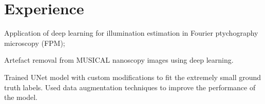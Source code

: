 \documentclass[]{deedy-resume-openfont}
\begin{document}
\begin{minipage}[t]{0.28\textwidth}

\sectionsep

%
%

\end{minipage} 
\hfill
\begin{minipage}[t]{0.7\textwidth} 

\section{Experience}

\vspace{\topsep} %
\begin{tightemize}
\item Application of deep learning for illumination estimation in Fourier ptychography microscopy (FPM);
\item Artefact removal from MUSICAL nanoscopy images using deep learning.
\end{tightemize}
\sectionsep

\begin{tightemize}
\item Trained UNet model with custom modifications to fit the extremely small ground truth labels. Used data augmentation techniques to improve the performance of the model. 
\end{tightemize}
\sectionsep


\end{minipage}
\end{document}
